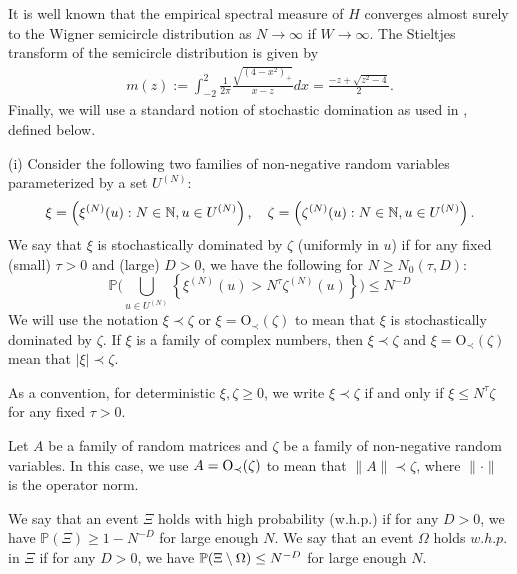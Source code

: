 It is well known that the empirical spectral measure of $H$ converges almost surely to the Wigner semicircle distribution as $N\to\infty$ if $W\to\infty$. The Stieltjes transform of the semicircle distribution is given by
%
\begin{align*}
m(z):=\int_{-2}^{2}\frac{1}{2\pi}\frac{\sqrt{(4-x^{2})_{+}}}{x-z}dx=\frac{-z+\sqrt{z^{2}-4}}{2}.
\end{align*}
%
Finally, we will use a standard notion of stochastic domination as used in \cite{Average_fluc}, defined below.
\begin{definition}\label{stoch_domination}
	{\rm{(i)}} Consider the following two families of non-negative random variables parameterized by a set $U^{(N)}$:
	\[\xi=\left(\xi^{(N)}(u):N\in\mathbb N, u\in U^{(N)}\right),\hskip 10pt \zeta=\left(\zeta^{(N)}(u):N\in\mathbb N, u\in U^{(N)}\right).\]
	We say that $\xi$ is stochastically dominated by $\zeta$ (uniformly in $u$) if for any fixed (small) $\tau>0$ and (large) $D>0$, we have the following for $N\geq N_{0}(\tau,D)$:
	\[\mathbb P\bigg(\bigcup_{u\in U^{(N)}}\left\{\xi^{(N)}(u)>N^\tau\zeta^{(N)}(u)\right\}\bigg)\le N^{-D}\]
	We will use the notation $\xi\prec\zeta$ or $\xi=\mathrm{O}_{\prec}(\zeta)$ to mean that $\xi$ is stochastically dominated by $\zeta$. If $\xi$ is a family of complex numbers, then $\xi\prec\zeta$ and $\xi=\mathrm{O}_{\prec}(\zeta)$ mean that $|\xi|\prec\zeta$. 
	
	\vspace{5pt}
	 As a convention, for deterministic $\xi,\zeta\geq0$, we write $\xi\prec\zeta$ if and only if $\xi\le N^\tau \zeta$ for any fixed $\tau>0$. 

 \vspace{5pt}
	 Let $A$ be a family of random matrices and $\zeta$ be a family of non-negative random variables. In this case, we use $A=\OO_\prec(\zeta)$ to mean that $\|A\|\prec \zeta$, where $\|\cdot\|$ is the operator norm. 
	
	\vspace{5pt}
	 We say that an event $\Xi$ holds with high probability (w.h.p.) if for any $D>0$, we have $\mathbb P(\Xi)\ge 1- N^{-D}$ for large enough $N$. We say that an event $\Omega$ holds $w.h.p.$ in $\Xi$ if for any $D>0$, we have
	$\P( \Xi\setminus \Omega)\le N^{-D}$ for large enough $N$.
\end{definition}






